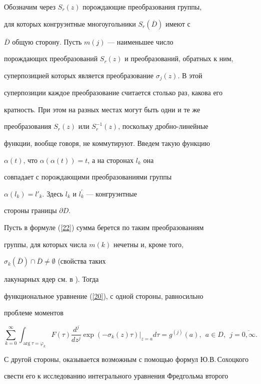 Обозначим через $S_r(z)$ порождающие преобразования группы, 


для которых конгруэнтные многоугольники $S_r(\overline{D})$ имеют с


$\overline{D}$ общую сторону. Пусть $m(j)$ --- наименьшее число


порождающих преобразований $S_r(z)$ и преобразований, обратных к ним,


суперпозицией которых является преобразование $\sigma_j(z)$. В этой


суперпозиции каждое преобразование считается столько раз, какова его


кратность. При этом на разных местах могут быть одни и те же


преобразования $S_r(z)$ или $S_r^{-1}(z)$, поскольку дробно-линейные


функции, вообще говоря, не коммутируют. Введем такую функцию


$\alpha(t)$, что $\alpha(\alpha(t))=t$, а на сторонах $l_k$ она


совпадает с порождающими преобразованиями группы


$\alpha(l_k)=l'_k$. Здесь $l_k$ и $l^\prime_k$ --- конгруэнтные


стороны границы $\partial D$.





Пусть в формуле (\ref{22}) сумма берется по таким преобразованиям


группы, для которых числа $m(k)$ нечетны и, кроме того,


$\sigma_k(\overline D)\cap \overline D \ne\emptyset$ (свойства таких


лакунарных ядер см. в \cite {Avtor3}). Тогда


функциональное уравнение (\ref{20}), с одной стороны, равносильно


проблеме моментов


$$


\sum_{k=0}^\infty\int_{\arg \tau=\varphi_k}F(\tau)\frac{d^j}{dz^j}


\exp(-\sigma_k(z)\tau)|_{z=a}d\tau=g^{(j)}(a),\ \ a\in D,


\ \ j=\overline{0,\infty}.


$$





С другой стороны, оказывается возможным с помощью формул Ю.В.\,Сохоцкого


свести его к исследованию интегрального уравнения Фредгольма второго


